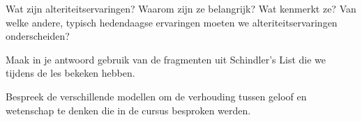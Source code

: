 \documentclass[main.tex]{subfiles}
\begin{document}
\begin{examenvraag}
    \begin{vraag}
        Wat zijn alteriteitservaringen? Waarom zijn ze belangrijk? Wat kenmerkt ze? Van welke andere, typisch hedendaagse ervaringen moeten we alteriteitservaringen onderscheiden?
    \end{vraag}

    \begin{antwoord}
    \end{antwoord}
\end{examenvraag}


\begin{examenvraag}
    \begin{vraag}
        Maak in je antwoord gebruik van de fragmenten uit Schindler’s List die we tijdens de les bekeken hebben.
    \end{vraag}

    \begin{antwoord}
    \end{antwoord}
\end{examenvraag}


\begin{examenvraag}
    \begin{vraag}
        Bespreek de verschillende modellen om de verhouding tussen geloof en wetenschap te denken die in de cursus besproken werden.
    \end{vraag}

    \begin{antwoord}
    \end{antwoord}
\end{examenvraag}
\end{document}
